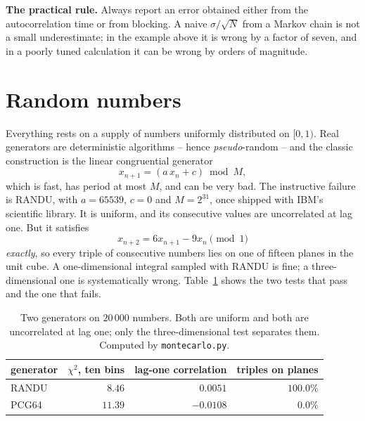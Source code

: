 \begin{notebox}
\textbf{The practical rule.} Always report an error obtained either from the
autocorrelation time or from blocking.  A naive $\sigma/\sqrt{N}$ from a
Markov chain is not a small underestimate; in the example above it is wrong
by a factor of seven, and in a poorly tuned calculation it can be wrong by
orders of magnitude.
\end{notebox}

\section{Random numbers}
\label{sec:randomnumbers}

Everything rests on a supply of numbers uniformly distributed on $[0,1)$.  Real
generators are deterministic algorithms -- hence \emph{pseudo}-random -- and
the classic construction is the linear congruential generator
\begin{equation}
  x_{n+1} = \left(a\,x_n + c\right)\bmod M ,
  \label{eq:12-lcg}
\end{equation}
which is fast, has period at most $M$, and can be very bad.  The instructive
failure is RANDU, with $a=65539$, $c=0$ and $M=2^{31}$, once shipped with
IBM's scientific library.  It is uniform, and its consecutive values are
uncorrelated at lag one.  But it satisfies
\begin{equation}
  x_{n+2} = 6x_{n+1} - 9x_n \pmod{1}
  \label{eq:12-randu}
\end{equation}
\emph{exactly}, so every triple of consecutive numbers lies on one of fifteen
planes in the unit cube.  A one-dimensional integral sampled with RANDU is
fine; a three-dimensional one is systematically wrong.
Table~\ref{tab:12-randu} shows the two tests that pass and the one that
fails.

\begin{table}[h]
\centering
\renewcommand{\arraystretch}{1.25}
\setlength{\tabcolsep}{12pt}
\begin{tabular}{lrrr}
\toprule
generator & $\chi^2$, ten bins & lag-one correlation & triples on planes\\
\midrule
RANDU & $8.46$  & $\phantom{-}0.0051$ & $100.0\%$\\
PCG64 & $11.39$ & $-0.0108$ & $\phantom{00}0.0\%$\\
\bottomrule
\end{tabular}
\caption{Two generators on $20\,000$ numbers.  Both are uniform and both are
uncorrelated at lag one; only the three-dimensional test separates them.
Computed by \texttt{montecarlo.py}.}
\label{tab:12-randu}
\end{table}

